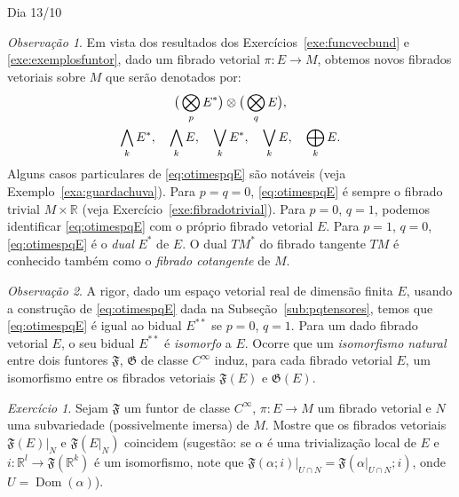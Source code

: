\documentclass[oneside,11pt]{amsart}
\newcommand{\R}{\mathds R}
\DeclareMathOperator{\Dom}{Dom}
\theoremstyle{remark}\newtheorem{exercise}{Exercício}[section]
\theoremstyle{plain}\newtheorem{teo}{Teorema}[section]
\theoremstyle{plain}\newtheorem{lem}[teo]{Lema}
\theoremstyle{plain}\newtheorem{prop}[teo]{Proposição}
\theoremstyle{definition}\newtheorem{defin}[teo]{Definição}
\theoremstyle{remark}\newtheorem{rem}[teo]{Observação}
\theoremstyle{definition}\newtheorem{example}[teo]{Exemplo}
\numberwithin{equation}{section}
\begin{document}
\begin{section}{Dia 13/10}
\begin{rem}\label{thm:remfuncE}
Em vista dos resultados dos Exercícios~\ref{exe:funcvecbund} e \ref{exe:exemplosfuntor}, dado um fibrado vetorial $\pi:E\to M$, obtemos novos fibrados vetoriais
sobre $M$ que serão denotados por:
\begin{gather}\label{eq:otimespqE}
\big(\bigotimes_pE^*\big)\otimes\big(\bigotimes_qE\big),\\
\notag\bigwedge_kE^*,\quad\bigwedge_kE,\quad\bigvee_kE^*,\quad\bigvee_kE,\quad\bigoplus_kE.
\end{gather}
Alguns casos particulares de \eqref{eq:otimespqE}
são notáveis (veja Exemplo~\ref{exa:guardachuva}). Para $p=q=0$, \eqref{eq:otimespqE} é sempre o fibrado trivial $M\times\R$
(veja Exercício~\ref{exe:fibradotrivial}). Para $p=0$, $q=1$, podemos identificar \eqref{eq:otimespqE} com o próprio fibrado vetorial $E$.
Para $p=1$, $q=0$, \eqref{eq:otimespqE} é o {\em dual\/} $E^*$ de $E$.
O dual $TM^*$ do fibrado tangente $TM$ é conhecido também como o {\em fibrado cotangente\/} de $M$.
\end{rem}

\noindent{}\hbox{\dbend}\hspace{10pt}\parbox[t]{330pt}{\begin{rem}
A rigor, dado um espaço vetorial real de dimensão finita $E$, usando a construção de \eqref{eq:otimespqE} dada na Subseção~\ref{sub:pqtensores},
temos que \eqref{eq:otimespqE} é igual ao bidual $E^{**}$ se $p=0$, $q=1$. Para um dado fibrado vetorial $E$, o seu bidual $E^{**}$
é {\em isomorfo\/} a $E$. Ocorre que um {\em isomorfismo natural\/} entre dois funtores $\mathfrak F$, $\mathfrak G$ de classe $C^\infty$
induz, para cada fibrado vetorial $E$, um isomorfismo entre os fibrados vetoriais $\mathfrak F(E)$ e $\mathfrak G(E)$.
\end{rem}}

\begin{exercise}
Sejam $\mathfrak F$ um funtor de classe $C^\infty$, $\pi:E\to M$ um fibrado vetorial e $N$ uma subvariedade (possivelmente imersa) de $M$.
Mostre que os fibrados vetoriais $\mathfrak F(E)\vert_N$ e $\mathfrak F(E\vert_N)$ coincidem (sugestão: se $\alpha$ é uma trivialização local
de $E$ e $i:\R^l\to\mathfrak F(\R^k)$ é um isomorfismo, note que $\mathfrak F(\alpha;i)\vert_{U\cap N}=\mathfrak F(\alpha\vert_{U\cap N};i)$,
onde $U=\Dom(\alpha)$).
\end{exercise}


\end{section}
\end{document}
